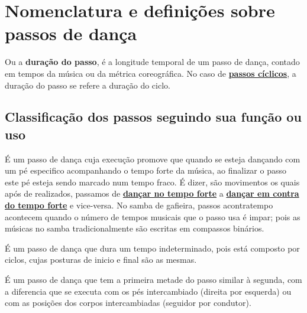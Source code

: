 
\section{Nomenclatura e definições sobre passos de dança}



\begin{definition} 
\label{def:DuracaoDoPasso}
Ou a \textbf{duração do passo}, 
é a longitude temporal de um passo de dança, contado em tempos da música ou da métrica coreográfica.
No caso de \hyperref[def:PassoCiclico]{\textbf{passos cíclicos}}, a duração do passo se refere a duração do ciclo.
\end{definition}

\subsection{Classificação dos passos seguindo sua função ou uso}

\begin{definition} 
\label{def:PassoAContratempo}
É um passo de dança cuja execução promove que quando se esteja dançando com um pé especifico acompanhando o tempo forte da música,
ao finalizar o passo este pé esteja sendo marcado num tempo fraco.
É dizer, são movimentos os quais após de realizados, 
passamos de \hyperref[def:DancaNoTempo]{\textbf{dançar no tempo forte}} a 
\hyperref[def:DancaNoContratempo]{\textbf{dançar em contra do tempo forte}} e vice-versa. 
No samba de gafieira, 
passos acontratempo acontecem quando o número de tempos musicais que o passo usa é impar;
pois as músicas no samba tradicionalmente são escritas em compassos binários. 
\end{definition}


\begin{definition} 
\label{def:PassoCiclico}
É um passo de dança que dura um tempo indeterminado,
pois está composto por ciclos, cujas posturas de inicio e final são as mesmas.
\end{definition}

\begin{definition} 
\label{def:PassoSimetrico}
É um passo de dança que tem a primeira metade do passo similar à segunda,
com a diferencia que se executa com os pés intercambiado (direita por esquerda)
ou com as posições dos corpos intercambiadas (seguidor por condutor).
\end{definition}


